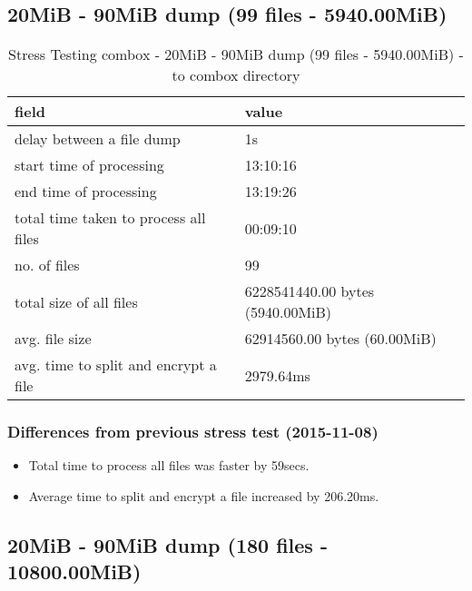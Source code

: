 \subsection{20MiB - 90MiB dump (99 files -
  5940.00MiB)}\label{4-st-5940}

\begin{center}
  \begin{table}[h]
    \begin{tabular}{ll}
      field & value\\
      \hline
      delay between a file dump & 1s\\
      start time of processing & 13:10:16\\
      end time of processing & 13:19:26\\
      total time taken to process all files & 00:09:10\\
      no. of files & 99\\
      total size of all files & 6228541440.00 bytes (5940.00MiB)\\
      avg. file size & 62914560.00 bytes (60.00MiB)\\
      avg. time to split and encrypt a file & 2979.64ms\\
    \end{tabular}
    \caption{Stress Testing combox - 20MiB - 90MiB dump (99 files - 5940.00MiB) - to combox directory}
  \end{table}
\end{center}

\subsubsection{Differences from previous stress test (2015-11-08)}

\begin{itemize}
\item Total time to process all files was faster by 59secs.
\item Average time to split and encrypt a file increased by 206.20ms.
\end{itemize}

\subsection{20MiB - 90MiB dump (180 files -
  10800.00MiB)}\label{4-st-10800}

